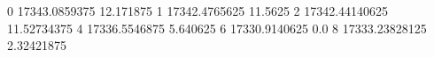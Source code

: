 0 17343.0859375 12.171875
1 17342.4765625 11.5625
2 17342.44140625 11.52734375
4 17336.5546875 5.640625
6 17330.9140625 0.0
8 17333.23828125 2.32421875
